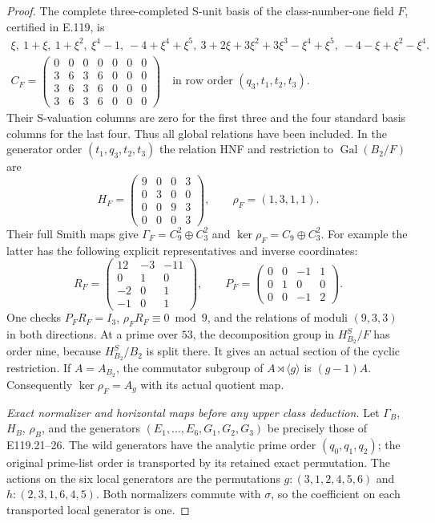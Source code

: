 \begin{proof}
The complete three-completed S-unit basis of the class-number-one
field $F$, certified in E.119, is
\[
 \begin{gathered}
 \xi,\ 1+\xi,\ 1+\xi^2,\ \xi^4-1,\ 
 -4+\xi^4+\xi^5,\ 
 3+2\xi+3\xi^2+3\xi^3-\xi^4+\xi^5,\ 
 -4-\xi+\xi^2-\xi^4.\\
 C_F=\begin{pmatrix}
 0&0&0&0&0&0&0\\
 3&6&3&6&0&0&0\\
 3&6&3&6&0&0&0\\
 3&6&3&6&0&0&0
 \end{pmatrix}
 \quad\text{in row order }(q_3,t_1,t_2,t_3).
 \end{gathered}
 \tag{E121.11}
\]
Their S-valuation columns are zero for the first three and
the four standard basis columns for the last four. Thus all
global relations have been included. In the generator order
$(t_1,q_3,t_2,t_3)$ the relation HNF and restriction to
$\operatorname{Gal}(B_2/F)$ are
\[
 H_F=\begin{pmatrix}9&0&0&3\\0&3&0&0\\0&0&9&3\\0&0&0&3\end{pmatrix},
 \qquad \rho_F=(1,3,1,1).
 \tag{E121.12}
\]
Their full Smith maps give
$\Gamma_F=C_9^2\oplus C_3^2$ and
$\ker\rho_F=C_9\oplus C_3^2$.
For example the latter has the following explicit representatives
and inverse coordinates:
\[
 R_F=\begin{pmatrix}12&-3&-11\\0&1&0\\-2&0&1\\-1&0&1\end{pmatrix},
 \qquad
 P_F=\begin{pmatrix}0&0&-1&1\\0&1&0&0\\0&0&-1&2\end{pmatrix}.
 \tag{E121.13}
\]
One checks $P_FR_F=I_3$, $\rho_FR_F\equiv0\bmod9$, and the
relations of moduli $(9,3,3)$ in both directions. At a prime
over $53$, the decomposition group in $H^S_{B_2}/F$ has
order nine, because $H^S_{B_2}/B_2$ is split there. It gives
an actual section of the cyclic restriction. If $A=A_{B_2}$,
the commutator subgroup of $A\rtimes\langle g\rangle$ is
$(g-1)A$. Consequently $\ker\rho_F=A_g$ with its actual
quotient map.

\emph{Exact normalizer and horizontal maps before any upper class deduction.}
Let $\Gamma_B$, $H_B$, $\rho_B$, and the generators
$(E_1,\ldots,E_6,G_1,G_2,G_3)$ be precisely those of
E119.21--26. The wild generators have the analytic prime order
$(q_0,q_1,q_2)$; the original prime-list order is transported
by its retained exact permutation. The actions on the six
local generators are the permutations
$g:(3,1,2,4,5,6)$ and $h:(2,3,1,6,4,5)$.
Both normalizers commute with $\sigma$, so the coefficient
on each transported local generator is one.


\end{proof}
